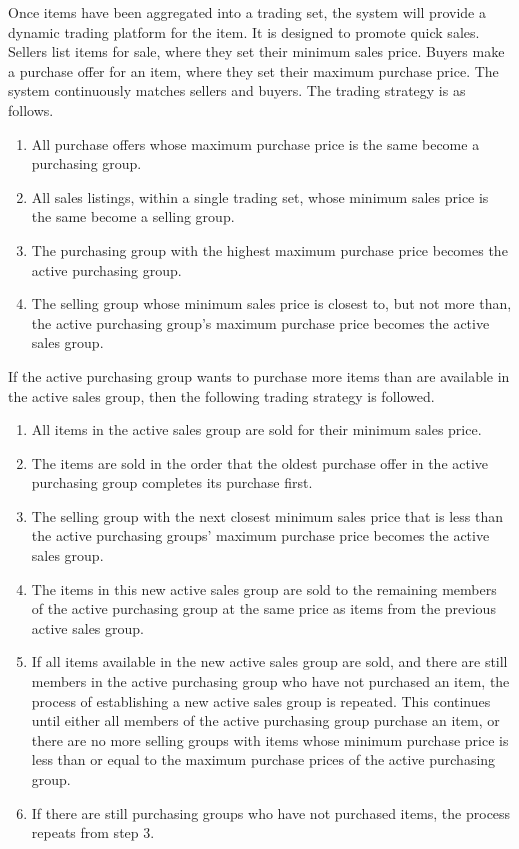 \documentclass{csse4400}
\begin{document}
Once items have been aggregated into a trading set, the system will provide a dynamic trading platform for the item.
It is designed to promote quick sales.
Sellers list items for sale, where they set their minimum sales price.
Buyers make a purchase offer for an item, where they set their maximum purchase price.
The system continuously matches sellers and buyers.
The trading strategy is as follows.
\begin{enumerate}
	\item All purchase offers whose maximum purchase price is the same become a purchasing group.
	\item All sales listings, within a single trading set, whose minimum sales price is the same become a selling group.
	\item The purchasing group with the highest maximum purchase price becomes the active purchasing group.
	\item The selling group whose minimum sales price is closest to, but not more than, the active purchasing group's maximum purchase price becomes the active sales group.
\end{enumerate}
If the active purchasing group wants to purchase more items than are available in the active sales group, then the following trading strategy is followed.
\begin{enumerate}[resume]
	\item All items in the active sales group are sold for their minimum sales price.
	\item The items are sold in the order that the oldest purchase offer in the active purchasing group completes its purchase first.
	\item The selling group with the next closest minimum sales price that is less than the active purchasing groups' maximum purchase price becomes the active sales group.
	\item The items in this new active sales group are sold to the remaining members of the active purchasing group at the same price as items from the previous active sales group.
	\item If all items available in the new active sales group are sold, and there are still members in the active purchasing group who have not purchased an item, the process of establishing a new active sales group is repeated. This continues until either all members of the active purchasing group purchase an item, or there are no more selling groups with items whose minimum purchase price is less than or equal to the maximum purchase prices of the active purchasing group.
	\item If there are still purchasing groups who have not purchased items, the process repeats from step 3.
\end{enumerate}
\end{document}
